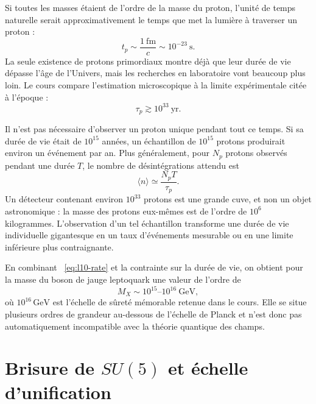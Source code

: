 Si toutes les masses étaient de l’ordre de la masse du proton, l’unité de temps naturelle serait approximativement le temps que met la lumière à traverser un proton :
\begin{equation}
t_p\sim\frac{1\ \mathrm{fm}}{c}\sim10^{-23}\ \mathrm{s}.
\label{eq:l10-proton-time}
\end{equation}
La seule existence de protons primordiaux montre déjà que leur durée de vie dépasse l’âge de l’Univers, mais les recherches en laboratoire vont beaucoup plus loin. Le cours compare l’estimation microscopique à la limite expérimentale citée à l’époque :
\begin{equation}
\tau_p\gtrsim10^{33}\ \mathrm{yr}.
\label{eq:l10-lifetime-bound}
\end{equation}

Il n’est pas nécessaire d’observer un proton unique pendant tout ce temps. Si sa durée de vie était de \(10^{15}\) années, un échantillon de \(10^{15}\) protons produirait environ un événement par an. Plus généralement, pour \(N_p\) protons observés pendant une durée \(T\), le nombre de désintégrations attendu est
\begin{equation}
\langle n\rangle\simeq\frac{N_pT}{\tau_p}.
\label{eq:l10-event-count}
\end{equation}
Un détecteur contenant environ \(10^{33}\) protons est une grande cuve, et non un objet astronomique : la masse des protons eux-mêmes est de l’ordre de \(10^6\) kilogrammes. L’observation d’un tel échantillon transforme une durée de vie individuelle gigantesque en un taux d’événements mesurable ou en une limite inférieure plus contraignante.

En combinant ~\eqref{eq:l10-rate} et la contrainte sur la durée de vie, on obtient pour la masse du boson de jauge leptoquark une valeur de l’ordre de
\begin{equation}
M_X\sim10^{15}\text{--}10^{16}\ \mathrm{GeV},
\label{eq:l10-mx}
\end{equation}
où \(10^{16}\,\mathrm{GeV}\) est l’échelle de sûreté mémorable retenue dans le cours. Elle se situe plusieurs ordres de grandeur au-dessous de l’échelle de Planck et n’est donc pas automatiquement incompatible avec la théorie quantique des champs.

\section{Brisure de \texorpdfstring{\(SU(5)\)}{SU(5)} et échelle d’unification}

